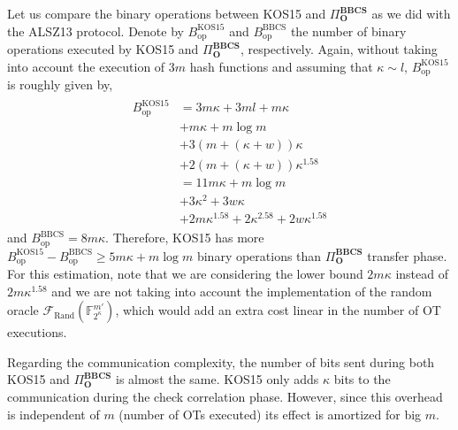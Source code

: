 Let us compare the binary operations between KOS15 and $\Pi^{\textbf{BBCS}}_{\textbf{O}}$ as we did with the ALSZ13 protocol. Denote by $B_{\text{op}}^\text{KOS15}$ and $B_{\text{op}}^\text{BBCS}$ the number of binary operations executed by KOS15 and $\Pi^{\textbf{BBCS}}_{\textbf{O}}$, respectively. Again, without taking into account the execution of $3 m$ hash functions and assuming that $\kappa \sim l$, $B_{\text{op}}^\text{KOS15}$ is roughly given by,
\begin{eqnarray*}
\begin{split}
    B_{\text{op}}^\text{KOS15} &= 3m\kappa + 3ml + m\kappa \\
    &+ m\kappa + m \log m \\
    &+ 3(m + (\kappa + w))\kappa \\
    &+ 2(m + (\kappa + w))\kappa^{1.58}\\
    &= 11 m \kappa  + m\log m \\
    &+ 3\kappa^2 + 3w\kappa  \\
    &+ 2 m \kappa^{1.58} + 2 \kappa^{2.58} + 2w\kappa^{1.58}
\end{split}
\end{eqnarray*}
and $B_{\text{op}}^\text{BBCS} = 8 m \kappa$. Therefore, KOS15 has more $B_{\text{op}}^\text{KOS15} - B_{\text{op}}^\text{BBCS}  \geq 5 m\kappa + m\log m$ binary operations than $\Pi^{\textbf{BBCS}}_{\textbf{O}}$ transfer phase. 
For this estimation, note that we are considering the lower bound $2 m \kappa$ instead of $2 m \kappa^{1.58}$ and we are not taking into account the implementation of the random oracle $\mathcal{F}_{\text{Rand}}(\mathbb{F}^{m'}_{2^\kappa})$, which would add an extra cost linear in the number of OT executions.

Regarding the communication complexity, the number of bits sent during both KOS15 and $\Pi^{\textbf{BBCS}}_{\textbf{O}}$ is almost the same. KOS15 only adds $\kappa$ bits to the communication during the check correlation phase. However, since this overhead is independent of $m$ (number of OTs executed) its effect is amortized for big $m$.

